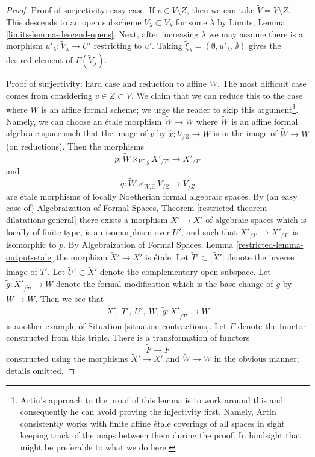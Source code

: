 \begin{proof}
\medskip\noindent
Proof of surjectivity: easy case.
If $v \in V \setminus Z$, then we can take $\tilde V = V \setminus Z$.
This descends to an open subscheme $\tilde V_\lambda \subset V_\lambda$
for some $\lambda$ by Limits, Lemma
\ref{limits-lemma-descend-opens}.
Next, after increasing $\lambda$ we may assume
there is a morphism $u'_\lambda : \tilde V_\lambda \to U'$
restricting to $u'$. Taking
$\tilde \xi_\lambda = (\emptyset, u'_\lambda, \emptyset)$
gives the desired element of $F(\tilde V_\lambda)$.

\medskip\noindent
Proof of surjectivity: hard case and reduction to affine $W$.
The most difficult case comes from considering $v \in Z \subset V$.
We claim that we can reduce this to the case where $W$ is an
affine formal scheme; we urge the reader to skip this argument\footnote{Artin's
approach to the proof of this lemma is to work around this and
consequently he can avoid proving the injectivity first. Namely, Artin
consistently works with finite affine \'etale coverings of all spaces
in sight keeping track of the maps between them during the proof.
In hindsight that might be preferable to what we do here.}.
Namely, we can choose an \'etale morphism
$\tilde W \to W$ where $\tilde W$ is an affine formal algebraic space
such that the image of $v$ by $\hat x : V_{/Z} \to W$ is
in the image of $\tilde W \to W$ (on reductions).
Then the morphisms
$$
p : \tilde W \times_{W, g} X'_{/T'} \longrightarrow X'_{/T'}
$$
and
$$
q : \tilde W \times_{W, \hat x} V_{/Z} \to V_{/Z}
$$
are \'etale morphisms of locally Noetherian formal algebraic spaces.
By (an easy case of) Algebraization of Formal Spaces, Theorem
\ref{restricted-theorem-dilatations-general}
there exists a morphism $\tilde X' \to X'$ of algebraic spaces
which is locally of finite type, is an isomorphism over $U'$, and
such that $\tilde X'_{/T'} \to X'_{/T'}$ is isomorphic to $p$.
By Algebraization of Formal Spaces, Lemma \ref{restricted-lemma-output-etale}
the morphism $\tilde X' \to X'$ is \'etale. Let
$\tilde T' \subset |\tilde X'|$ denote the inverse image of $T'$.
Let $\tilde U' \subset \tilde X'$ denote the complementary open subspace.
Let $\tilde g : \tilde X'_{/\tilde T'} \to \tilde W$
denote the formal modification which is the base change of $g$ by
$\tilde W \to W$. Then we see that
$$
\tilde X',\ \tilde T',\ \tilde U',\ \tilde W,
\ \tilde g : \tilde X'_{/\tilde T'} \to \tilde W
$$
is another example of Situation \ref{situation-contractions}.
Let $\tilde F$ denote the functor constructed from this triple.
There is a transformation of functors
$$
\tilde F \longrightarrow F
$$
constructed using the morphisms $\tilde X' \to X'$ and
$\tilde W \to W$ in the obvious manner; details omitted.


\end{proof}
